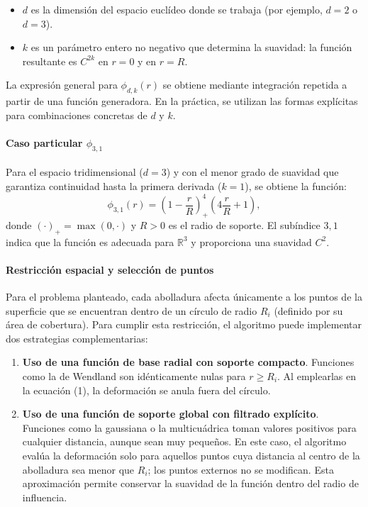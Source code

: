 \documentclass[12pt, letterpaper]{article}
\begin{document}
\begin{itemize}
    \item \(d\) es la dimensión del espacio euclídeo donde se trabaja (por ejemplo, \(d=2\) o \(d=3\)).
    \item \(k\) es un parámetro entero no negativo que determina la suavidad: la función resultante es \(C^{2k}\) en \(r=0\) y en \(r=R\).
\end{itemize}

La expresión general para \(\phi_{d,k}(r)\) se obtiene mediante integración repetida a partir de una función generadora. En la práctica, se utilizan las formas explícitas para combinaciones concretas de \(d\) y \(k\).

\paragraph{Caso particular \(\phi_{3,1}\)}
Para el espacio tridimensional (\(d=3\)) y con el menor grado de suavidad que garantiza continuidad hasta la primera derivada (\(k=1\)), se obtiene la función:
\[
\phi_{3,1}(r) = \left(1 - \frac{r}{R}\right)_+^4 \left(4\frac{r}{R} + 1\right),
\]
donde \((\cdot)_+ = \max(0,\cdot)\) y \(R>0\) es el radio de soporte. El subíndice \(3,1\) indica que la función es adecuada para \(\mathbb{R}^3\) y proporciona una suavidad \(C^2\).

\paragraph{Restricción espacial y selección de puntos}
Para el problema planteado, cada abolladura afecta únicamente a los puntos de la superficie que se encuentran dentro de un círculo de radio \(R_i\) (definido por su área de cobertura). Para cumplir esta restricción, el algoritmo puede implementar dos estrategias complementarias:

\begin{enumerate}
    \item \textbf{Uso de una función de base radial con soporte compacto}.  
    Funciones como la de Wendland son idénticamente nulas para \(r \ge R_i\). Al emplearlas en la ecuación (1), la deformación se anula fuera del círculo.

    \item \textbf{Uso de una función de soporte global con filtrado explícito}.  
    Funciones como la gaussiana o la multicuádrica toman valores positivos para cualquier distancia, aunque sean muy pequeños. En este caso, el algoritmo evalúa la deformación solo para aquellos puntos cuya distancia al centro de la abolladura sea menor que \(R_i\); los puntos externos no se modifican. Esta aproximación permite conservar la suavidad de la función dentro del radio de influencia.
\end{enumerate}
\end{document}
